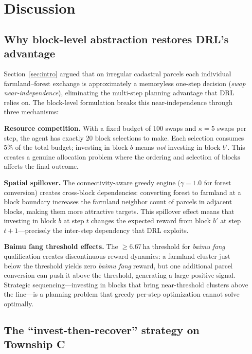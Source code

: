 \documentclass[preprint,12pt]{elsarticle}
\begin{document}
\section{Discussion}
\label{sec:discussion}

\subsection{Why block-level abstraction restores DRL's advantage}

Section~\ref{sec:intro} argued that on irregular cadastral parcels each individual farmland--forest exchange is approximately a memoryless one-step decision (\textit{swap near-independence}), eliminating the multi-step planning advantage that DRL relies on. The block-level formulation breaks this near-independence through three mechanisms:

\textbf{Resource competition.} With a fixed budget of 100 swaps and $\kappa = 5$ swaps per step, the agent has exactly 20 block selections to make. Each selection consumes 5\% of the total budget; investing in block $b$ means \textit{not} investing in block $b'$. This creates a genuine allocation problem where the ordering and selection of blocks affects the final outcome.

\textbf{Spatial spillover.} The connectivity-aware greedy engine ($\gamma = 1.0$ for forest conversion) creates cross-block dependencies: converting forest to farmland at a block boundary increases the farmland neighbor count of parcels in adjacent blocks, making them more attractive targets. This spillover effect means that investing in block $b$ at step $t$ changes the expected reward from block $b'$ at step $t+1$---precisely the inter-step dependency that DRL exploits.

\textbf{Baimu fang threshold effects.} The $\geq$6.67\,ha threshold for \textit{baimu fang} qualification creates discontinuous reward dynamics: a farmland cluster just below the threshold yields zero \textit{baimu fang} reward, but one additional parcel conversion can push it above the threshold, generating a large positive signal. Strategic sequencing---investing in blocks that bring near-threshold clusters above the line---is a planning problem that greedy per-step optimization cannot solve optimally.

\subsection{The ``invest-then-recover'' strategy on Township C}
\end{document}
